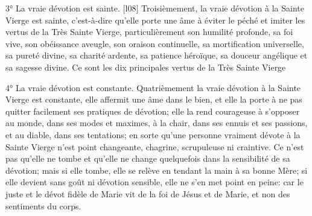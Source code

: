 3° La vraie dévotion est sainte.
[l08] Troisièmement, la vraie dévotion à la Sainte Vierge est sainte, c'est-à-dire qu'elle porte une âme à éviter le
péché et imiter les vertus de la Très Sainte Vierge, particulièrement son humilité profonde, sa foi vive, son
obéissance aveugle, son oraison continuelle, sa mortification universelle, sa pureté divine, sa charité ardente, sa
patience héroïque, sa douceur angélique et sa sagesse divine. Ce sont les dix principales vertus de la Très Sainte
Vierge

4° La vraie dévotion est constante.
 Quatrièmement la vraie dévotion à la Sainte Vierge est constante, elle affermit une âme dans le bien, et elle
la porte à ne pas quitter facilement ses pratiques de dévotion; elle la rend courageuse à s'opposer au monde, dans
ses modes et maximes, à la chair, dans ses ennuis et ses passions, et au diable, dans ses tentations; en sorte
qu'une personne vraiment dévote à la Sainte Vierge n'est point changeante, chagrine, scrupuleuse ni craintive. Ce
n'est pas qu'elle ne tombe et qu'elle ne change quelquefois dans la sensibilité de sa dévotion; mais si elle tombe,
elle se relève en tendant la main à sa bonne Mère; si elle devient sans goût ni dévotion sensible, elle ne s'en met
point en peine: car le juste et le dévot fidèle de Marie vit de la foi de Jésus et de Marie, et non des sentiments du
corps.

